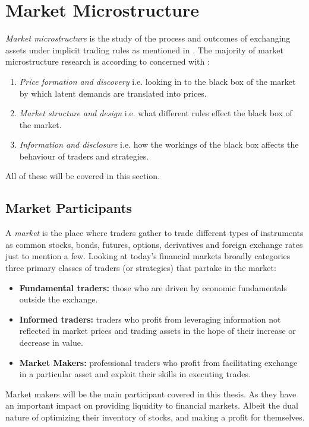 \documentclass{kththesis}
\theoremstyle{definition}
\begin{document}



\section{Market Microstructure}
\textit{Market microstructure} is the study of the process and outcomes of exchanging assets under implicit trading rules as mentioned in \textcite{o1995market}. The majority of market microstructure research is according to \textcite{madhavan2000market} concerned with : 
\begin{enumerate}
    \item \textit{Price formation and discovery} i.e. looking in to the black box of the market by which latent demands are translated into prices.
    \item \textit{Market structure and design} i.e. what different rules effect the black box of the market.
    \item \textit{Information and disclosure} i.e. how the workings of the black box affects the behaviour of traders and strategies.
\end{enumerate}
All of these will be covered in this section.

\newpage

\subsection{Market Participants}
A \textit{market} is the place where traders gather to trade \parencite{harris2003trading} different types of instruments as common stocks, bonds, futures, options, derivatives and foreign exchange rates just to mention a few.
Looking at today's financial markets
\textcite{cartea2015algorithmic} broadly categories three primary classes of traders (or strategies) that partake in the market:
\begin{itemize}
    \item \textbf{Fundamental traders:} those who are driven by economic fundamentals outside the exchange.
    \item \textbf{Informed traders:} traders who profit from leveraging information not reflected in market prices and trading assets in the hope of their increase or decrease in value.
    \item \textbf{Market Makers:} professional traders who profit from facilitating exchange in a particular asset and exploit their skills in executing trades.
\end{itemize}
Market makers will be the main participant covered in this thesis. As they have an important impact on providing liquidity to financial markets. Albeit the dual nature of optimizing their inventory of stocks, and making a profit for themselves.
\end{document}
